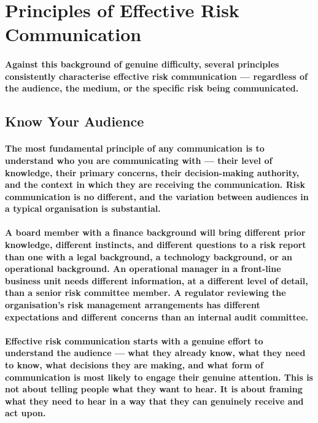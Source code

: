 \section{Principles of Effective Risk Communication}
\paragraph{Against this background of genuine difficulty, several principles consistently characterise effective risk communication — regardless of the audience, the medium, or the specific risk being communicated.}

\subsection{Know Your Audience}
\paragraph{The most fundamental principle of any communication is to understand who you are communicating with — their level of knowledge, their primary concerns, their decision-making authority, and the context in which they are receiving the communication. Risk communication is no different, and the variation between audiences in a typical organisation is substantial.}
\paragraph{A board member with a finance background will bring different prior knowledge, different instincts, and different questions to a risk report than one with a legal background, a technology background, or an operational background. An operational manager in a front-line business unit needs different information, at a different level of detail, than a senior risk committee member. A regulator reviewing the organisation's risk management arrangements has different expectations and different concerns than an internal audit committee.}
\paragraph{Effective risk communication starts with a genuine effort to understand the audience — what they already know, what they need to know, what decisions they are making, and what form of communication is most likely to engage their genuine attention. This is not about telling people what they want to hear. It is about framing what they need to hear in a way that they can genuinely receive and act upon.}

